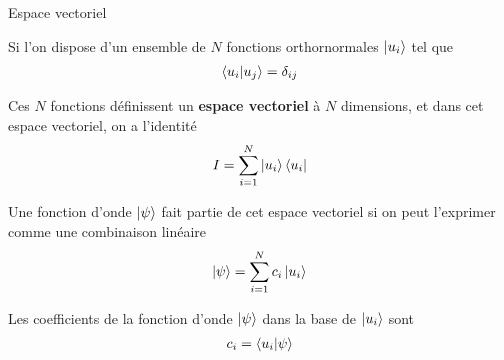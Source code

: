 \documentclass[xcolor=svgnames,t,aspectratio=169,handout]{uqtrcours}
\begin{document}
%
%
%
%
%
%



\begin{frame}{Espace vectoriel}

Si l'on dispose d'un ensemble de $N$ fonctions orthornormales
  $\ket{u_i}$ tel que
\begin{align}
  \braket{u_i \vert u_j} = \delta_{ij}
\end{align}

Ces $N$ fonctions définissent un \textbf{espace vectoriel} à $N$ dimensions,
  et dans cet espace vectoriel, on a l'identité
\vspace{-3mm}
\begin{align}
  I = \sum_{i=1}^N \ket{u_i} \bra{u_i}
\end{align}

Une fonction d'onde $\ket{\psi}$
  fait partie de cet espace vectoriel
  si on peut l'exprimer comme une combinaison linéaire
\vspace{-3mm}
\begin{align}
  \ket{\psi} = \sum_{i=1}^N c_i \ket{u_i}
\end{align}

Les coefficients de la fonction d'onde $\ket{\psi}$
  dans la base de $\ket{u_i}$ sont
\begin{align}
  c_i = \braket{u_i \vert \psi}
\end{align}

\end{frame}
\end{document}
